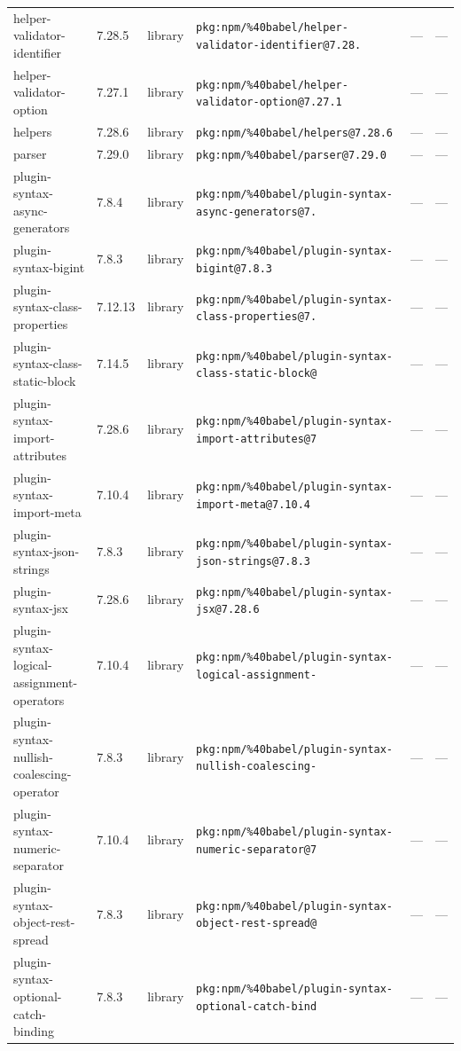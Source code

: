 \documentclass[11pt]{article}
\begin{document}
\begin{longtable}{|l|l|l|p{2.2cm}|l|p{4cm}|}
helper-validator-identifier & 7.28.5 & library & \texttt{pkg:npm/\%40babel/helper-validator-identifier@7.28.} & — & — \\
helper-validator-option & 7.27.1 & library & \texttt{pkg:npm/\%40babel/helper-validator-option@7.27.1} & — & — \\
helpers & 7.28.6 & library & \texttt{pkg:npm/\%40babel/helpers@7.28.6} & — & — \\
parser & 7.29.0 & library & \texttt{pkg:npm/\%40babel/parser@7.29.0} & — & — \\
plugin-syntax-async-generators & 7.8.4 & library & \texttt{pkg:npm/\%40babel/plugin-syntax-async-generators@7.} & — & — \\
plugin-syntax-bigint & 7.8.3 & library & \texttt{pkg:npm/\%40babel/plugin-syntax-bigint@7.8.3} & — & — \\
plugin-syntax-class-properties & 7.12.13 & library & \texttt{pkg:npm/\%40babel/plugin-syntax-class-properties@7.} & — & — \\
plugin-syntax-class-static-block & 7.14.5 & library & \texttt{pkg:npm/\%40babel/plugin-syntax-class-static-block@} & — & — \\
plugin-syntax-import-attributes & 7.28.6 & library & \texttt{pkg:npm/\%40babel/plugin-syntax-import-attributes@7} & — & — \\
plugin-syntax-import-meta & 7.10.4 & library & \texttt{pkg:npm/\%40babel/plugin-syntax-import-meta@7.10.4} & — & — \\
plugin-syntax-json-strings & 7.8.3 & library & \texttt{pkg:npm/\%40babel/plugin-syntax-json-strings@7.8.3} & — & — \\
plugin-syntax-jsx & 7.28.6 & library & \texttt{pkg:npm/\%40babel/plugin-syntax-jsx@7.28.6} & — & — \\
plugin-syntax-logical-assignment-operators & 7.10.4 & library & \texttt{pkg:npm/\%40babel/plugin-syntax-logical-assignment-} & — & — \\
plugin-syntax-nullish-coalescing-operator & 7.8.3 & library & \texttt{pkg:npm/\%40babel/plugin-syntax-nullish-coalescing-} & — & — \\
plugin-syntax-numeric-separator & 7.10.4 & library & \texttt{pkg:npm/\%40babel/plugin-syntax-numeric-separator@7} & — & — \\
plugin-syntax-object-rest-spread & 7.8.3 & library & \texttt{pkg:npm/\%40babel/plugin-syntax-object-rest-spread@} & — & — \\
plugin-syntax-optional-catch-binding & 7.8.3 & library & \texttt{pkg:npm/\%40babel/plugin-syntax-optional-catch-bind} & — & — \\

\end{longtable}
\end{document}
